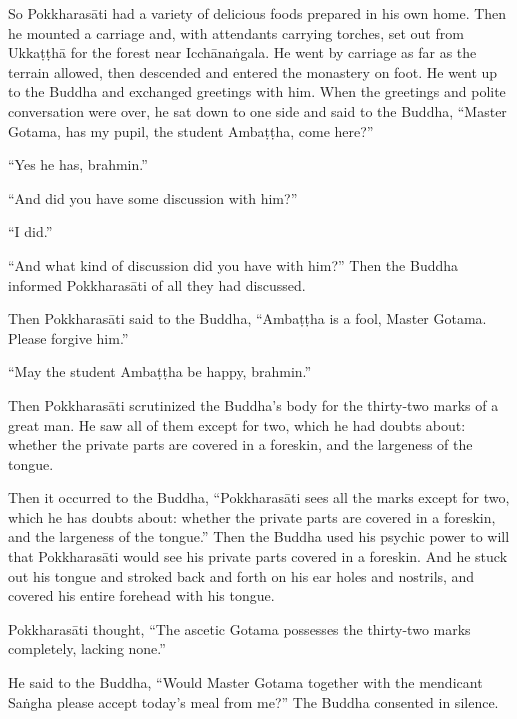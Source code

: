 \documentclass[12pt,openany]{book}%
\begin{document}
So \textsanskrit{Pokkharasāti} had a variety of delicious foods prepared in his own home. Then he mounted a carriage and, with attendants carrying torches, set out from \textsanskrit{Ukkaṭṭhā} for the forest near \textsanskrit{Icchānaṅgala}. He went by carriage as far as the terrain allowed, then descended and entered the monastery on foot. He went up to the Buddha and exchanged greetings with him. When the greetings and polite conversation were over, he sat down to one side and said to the Buddha, “Master Gotama, has my pupil, the student \textsanskrit{Ambaṭṭha}, come here?” 

“Yes he has, brahmin.” 

“And did you have some discussion with him?” 

“I did.” 

“And what kind of discussion did you have with him?” Then the Buddha informed \textsanskrit{Pokkharasāti} of all they had discussed. 

Then \textsanskrit{Pokkharasāti} said to the Buddha, “\textsanskrit{Ambaṭṭha} is a fool, Master Gotama. Please forgive him.” 

“May the student \textsanskrit{Ambaṭṭha} be happy, brahmin.” 

Then \textsanskrit{Pokkharasāti} scrutinized the Buddha’s body for the thirty-two marks of a great man. He saw all of them except for two, which he had doubts about: whether the private parts are covered in a foreskin, and the largeness of the tongue. 

Then it occurred to the Buddha, “\textsanskrit{Pokkharasāti} sees all the marks except for two, which he has doubts about: whether the private parts are covered in a foreskin, and the largeness of the tongue.” Then the Buddha used his psychic power to will that \textsanskrit{Pokkharasāti} would see his private parts covered in a foreskin. And he stuck out his tongue and stroked back and forth on his ear holes and nostrils, and covered his entire forehead with his tongue. 

\textsanskrit{Pokkharasāti} thought, “The ascetic Gotama possesses the thirty-two marks completely, lacking none.” 

He said to the Buddha, “Would Master Gotama together with the mendicant \textsanskrit{Saṅgha} please accept today’s meal from me?” The Buddha consented in silence. 
\end{document}
